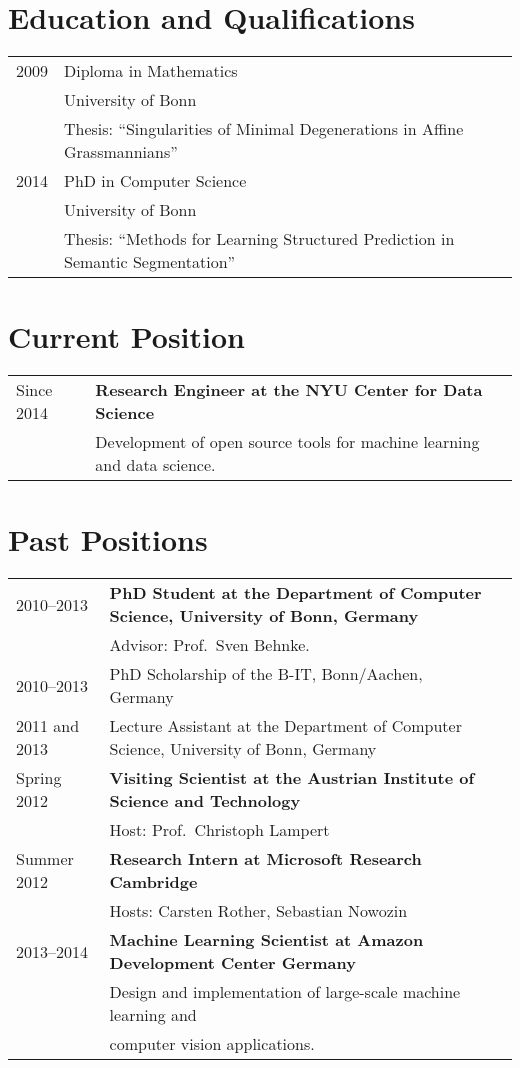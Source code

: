 \documentclass[a4paper,11pt]{article}
\begin{document}
\maketitle

\section{Education and Qualifications}
\begin{tabular}{lll}
    2009 & Diploma in Mathematics \\ & University of Bonn\\
         & Thesis: ``Singularities of Minimal Degenerations in Affine Grassmannians'' \\
    2014 & PhD in Computer Science \\ & University of Bonn \\
         & Thesis: ``Methods for Learning Structured Prediction in Semantic Segmentation''
\end{tabular}

\section{Current Position}
\begin{tabular}{lll}
    Since 2014 & \textbf{Research Engineer at the NYU Center for Data Science}\\
               & Development of open source tools for machine learning and data science.\\
\end{tabular}

\section{Past Positions}
\begin{tabular}{lll}
    2010--2013 & \textbf{PhD Student at the Department of Computer Science, University of Bonn, Germany}\\
         & Advisor: Prof.\ Sven Behnke. \\
    2010--2013 & PhD Scholarship of the B-IT, Bonn/Aachen, Germany\\
    2011 and 2013& Lecture Assistant at the Department of Computer Science, University of Bonn, Germany \\
    Spring 2012 & \textbf{Visiting Scientist at the Austrian Institute of Science and Technology}\\
               & Host: Prof.\ Christoph Lampert\\
    Summer 2012 & \textbf{Research Intern at Microsoft Research Cambridge}\\
               & Hosts: Carsten Rother, Sebastian Nowozin\\
    2013--2014 & \textbf{Machine Learning Scientist at Amazon Development Center Germany}\\
              & Design and implementation of large-scale machine learning and\\
              & computer vision applications.
\end{tabular}
\end{document}
